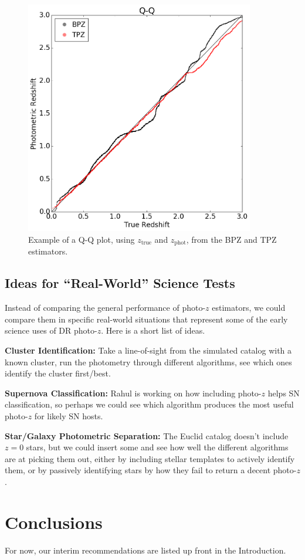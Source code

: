 \documentclass[DM,lsstdraft,toc]{lsstdoc}
\begin{document}
\begin{figure}
\begin{center}
\includegraphics[width=10cm]{figures/qq_BPZ_TPZ.png}
\caption{Example of a Q-Q plot, using $z_\mathrm{true}$ and $z_\mathrm{phot}$, from the BPZ and TPZ estimators.}\label{fig:qq}
\end{center}
\end{figure}


\subsection{Ideas for ``Real-World'' Science Tests}\label{ssec:more}

Instead of comparing the general performance of photo-$z$ estimators, we could compare them in specific real-world situations that represent some of the early science uses of DR photo-$z$. Here is a short list of ideas.

\textbf{Cluster Identification:} Take a line-of-sight from the simulated catalog with a known cluster, run the photometry through different algorithms, see which ones identify the cluster first/best.

\textbf{Supernova Classification:} Rahul is working on how including photo-$z$ helps SN classification, so perhaps we could see which algorithm produces the most useful photo-$z$ for likely SN hosts.

\textbf{Star/Galaxy Photometric Separation:} The Euclid catalog doesn't include $z=0$ stars, but we could insert some and see how well the different algorithms are at picking them out, either by including stellar templates to actively identify them, or by passively identifying stars by how they fail to return a decent photo-$z$.

\section{Conclusions}

For now, our interim recommendations are listed up front in the Introduction.


\end{document}
